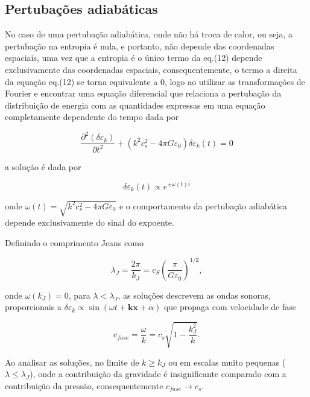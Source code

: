\subsection*{Pertubações adiabáticas}

No caso de uma pertubação adiabática, onde não há troca de calor, ou seja, a pertubação na entropia é nula, e portanto, não depende das coordenadas espaciais, uma vez que a entropia é o único termo da eq.(12) depende exclusivamente das coordenadas espaciais, consequentemente, o termo a direita da equação eq.(12) se torna equivalente a 0, logo ao utilizar as transformações de Fourier e encontrar uma equação diferencial que relaciona a pertubação da distribuição de energia com as quantidades expressas em uma equação completamente dependente do tempo dada por 

\begin{equation}\label{eq13}
	\dfrac{\partial^2 (\delta\varepsilon_k )}{\partial t^2} +(k^2c^2_s - 4\pi G\varepsilon_0)\delta\varepsilon_k (t) = 0
\end{equation}

a solução é dada por 

\begin{equation}\label{eq14}
	\delta\varepsilon_k (t) \propto e^{\pm \omega (t) i}
\end{equation}

onde $\omega (t) = \sqrt{k^2c^2_s - 4\pi G \varepsilon_0}$ e o comportamento da pertubação adiabática depende exclusivamente do sinal do expoente.

Definindo o comprimento Jeans como

\begin{equation}\label{eq15}
	\lambda_J = \dfrac{2\pi}{k_J} = c_S \left(\dfrac{\pi}{G\varepsilon_0} \right)^{1/2},
\end{equation}

onde $\omega (k_J) = 0$, para  $\lambda < \lambda_J$, as soluções descrevem as ondas sonoras, proporcionais a $ \delta\varepsilon_k \propto \sin (\omega t + \mathbf{k}\mathbf{x} + \alpha) $ que propaga com velocidade de fase 

\begin{equation}\label{eq16}
	c_{fase} = \dfrac{\omega}{k}= c_s\sqrt{1 - \dfrac{k^2_J}{k}}.
\end{equation}

Ao analisar as soluções, no limite de $k \geq k_J$ ou em escalas muito pequenas ($\lambda \leq \lambda_J$), onde a contribuição da gravidade é insignificante comparado com a contribuição da pressão, consequentemente $c_{fase} \to c_s$.\\

